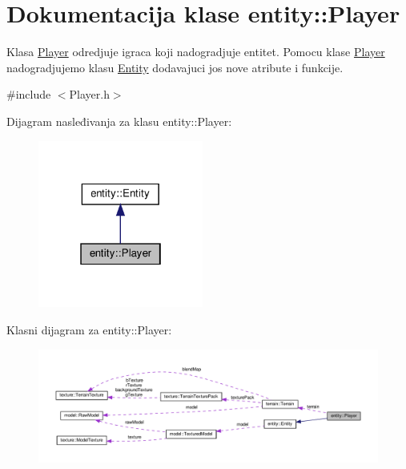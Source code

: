 \hypertarget{classentity_1_1Player}{}\section{Dokumentacija klase entity\+:\+:Player}
\label{classentity_1_1Player}


Klasa \hyperlink{classentity_1_1Player}{Player} odredjuje igraca koji nadogradjuje entitet. Pomocu klase \hyperlink{classentity_1_1Player}{Player} nadogradjujemo klasu \hyperlink{classentity_1_1Entity}{Entity} dodavajuci jos nove atribute i funkcije.  




{\ttfamily \#include $<$Player.\+h$>$}



Dijagram nasleđivanja za klasu entity\+:\+:Player\+:
\nopagebreak
\begin{figure}[H]
\begin{center}
\leavevmode
\includegraphics[width=154pt]{classentity_1_1Player__inherit__graph}
\end{center}
\end{figure}


Klasni dijagram za entity\+:\+:Player\+:
\nopagebreak
\begin{figure}[H]
\begin{center}
\leavevmode
\includegraphics[width=350pt]{classentity_1_1Player__coll__graph}
\end{center}
\end{figure}

